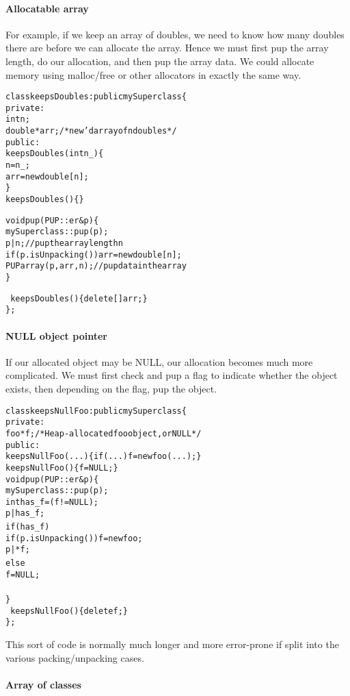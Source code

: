 \paragraph{Allocatable array}

For example, if we keep an array of doubles,
we need to know how many doubles there are 
before we can allocate the array.  Hence we must
first pup the array length, do our allocation,
and then pup the array data.  We could allocate memory using 
malloc/free or other allocators in exactly the same way.
\begin{alltt}
class keepsDoubles : public mySuperclass \{
private:
    int n;
    double *arr;/*new'd array of n doubles*/
public:
    keepsDoubles(int n_) \{
      n=n_;
      arr=new double[n];
    \}
    keepsDoubles() \{ \} 
    
    void pup(PUP::er &p) \{
      mySuperclass::pup(p);
      p|n;//pup the array length n
      if (p.isUnpacking())  arr=new double[n];
      PUParray(p,arr,n); //pup data in the array
    \}
    
    ~keepsDoubles() \{delete[] arr;\}
\};
\end{alltt}

\paragraph{NULL object pointer}

If our allocated object may be NULL, our allocation
becomes much more complicated.  We must first check
and pup a flag to indicate whether the object exists, 
then depending on the flag, pup the object.
\begin{alltt}
class keepsNullFoo : public mySuperclass \{
private:
    foo *f; /*Heap-allocated foo object, or NULL*/
public:
    keepsNullFoo(...) \{ if (...) f=new foo(...);\}
    keepsNullFoo() \{f=NULL;\}
    void pup(PUP::er &p) \{
      mySuperclass::pup(p);
      int has_f=(f!=NULL);
      p|has_f;
      if (has_f) {
        if (p.isUnpacking()) f=new foo;
        p|*f;
      } else {
        f=NULL;
      }
    \}
    ~keepsNullFoo() \{delete f;\}
\};
\end{alltt}

This sort of code is normally much longer and more
error-prone if split into the various packing/unpacking cases.

\paragraph{Array of classes}

